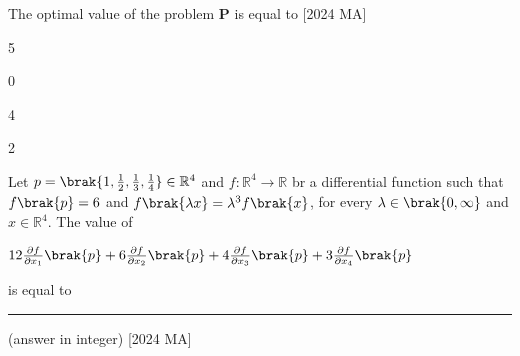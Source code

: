 The optimal value of the problem \textbf{P} is equal to  \hfill [2024 MA]
\begin{enumerate}
    \begin{multicols}{4}
        \item 5
        \item 0 
        \item 4 
        \item 2
    \end{multicols}
\end{enumerate}
 \item Let $p = \brak{1 , \frac{1}{2} , \frac{1}{3}, \frac{1}{4}} \in \mathbb{R}^4$ and $f : \mathbb{R}^4 \to \mathbb{R}$ br a differential function such that $f\brak{p} = 6$ and $f \brak{\lambda x} = \lambda ^3 f\brak{x}$, for every $\lambda \in \brak{0, \infty}$ and $x \in \mathbb{R}^4$. The value of 
 \begin{center}
     $12 \frac{\partial f}{\partial x_1} \brak{p} + 6 \frac{\partial f}{\partial x_2} \brak{p} + 4 \frac{\partial f}{ \partial x_3} \brak{p} + 3 \frac{\partial f}{\partial x_4}\brak{p}$
 \end{center}
 is equal to \rule{2cm}{0.4pt} (answer in integer) \hfill [2024 MA]
